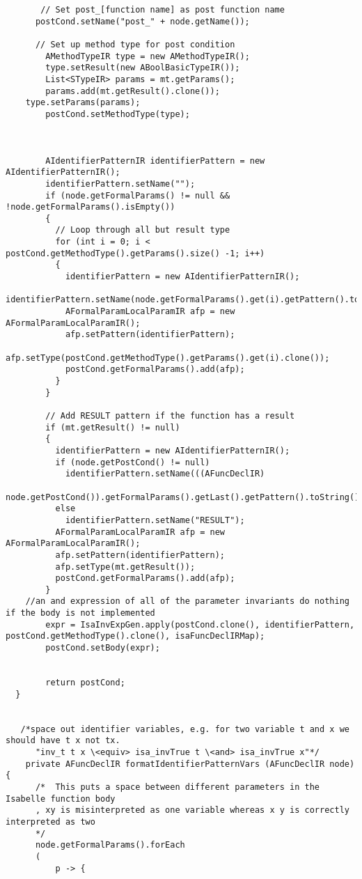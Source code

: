 \begin{appendices}
\begin{lstlisting}
       // Set post_[function name] as post function name
      postCond.setName("post_" + node.getName()); 
        
      // Set up method type for post condition
        AMethodTypeIR type = new AMethodTypeIR();
        type.setResult(new ABoolBasicTypeIR());
        List<STypeIR> params = mt.getParams();
        params.add(mt.getResult().clone());
    type.setParams(params);
        postCond.setMethodType(type);
        
        
        
        AIdentifierPatternIR identifierPattern = new AIdentifierPatternIR();
        identifierPattern.setName("");
        if (node.getFormalParams() != null && !node.getFormalParams().isEmpty())
        {
          // Loop through all but result type
          for (int i = 0; i < postCond.getMethodType().getParams().size() -1; i++)
          {
            identifierPattern = new AIdentifierPatternIR();
              identifierPattern.setName(node.getFormalParams().get(i).getPattern().toString());
            AFormalParamLocalParamIR afp = new AFormalParamLocalParamIR();
            afp.setPattern(identifierPattern);
            afp.setType(postCond.getMethodType().getParams().get(i).clone()); 
            postCond.getFormalParams().add(afp);
          }
        }
        
        // Add RESULT pattern if the function has a result
        if (mt.getResult() != null)
        {
          identifierPattern = new AIdentifierPatternIR();
          if (node.getPostCond() != null)
            identifierPattern.setName(((AFuncDeclIR) 
                node.getPostCond()).getFormalParams().getLast().getPattern().toString());
          else
            identifierPattern.setName("RESULT");
          AFormalParamLocalParamIR afp = new AFormalParamLocalParamIR();
          afp.setPattern(identifierPattern);
          afp.setType(mt.getResult()); 
          postCond.getFormalParams().add(afp);
        }
    //an and expression of all of the parameter invariants do nothing if the body is not implemented
        expr = IsaInvExpGen.apply(postCond.clone(), identifierPattern, postCond.getMethodType().clone(), isaFuncDeclIRMap);
        postCond.setBody(expr);
        
        
        return postCond;
  }
    
    
   /*space out identifier variables, e.g. for two variable t and x we should have t x not tx. 
      "inv_t t x \<equiv> isa_invTrue t \<and> isa_invTrue x"*/
    private AFuncDeclIR formatIdentifierPatternVars (AFuncDeclIR node) {
      /*  This puts a space between different parameters in the Isabelle function body
      , xy is misinterpreted as one variable whereas x y is correctly interpreted as two
      */
      node.getFormalParams().forEach
      (   
          p -> { 
            

\end{lstlisting}
\end{appendices}
